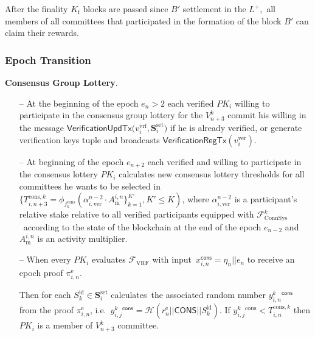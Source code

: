 \begin{legal}
    \item After the finality $K_{\text{f}}$ blocks are passed since $B'$ settlement in the $L^+$,\
    all members of all committees that participated in the formation of the block $B'$ can claim their rewards.

\end{legal}

\subsubsection{Epoch Transition}\label{subsubsec:epoch-transition}
\begin{legal}
    \item \textbf{Consensus Group Lottery}.
    \begin{itemize}
        \item [--] At the beginning of the epoch ${e_n > 2}$ each verified $PK_i$ willing to participate in the
        consensus group lottery for the $V^k_{n + 3}$ commit his willing in the message $\textsf{VerificationUpdTx(}v_i^{\text{vrf}}, \mathbf{S}_i^{\text{set}}\textsf{)}$
        if he is already verified, or generate verification keys tuple and broadcasts $\textsf{VerificationRegTx}(v_i^{\text{ver}})$.
        \item[--] At beginning of the epoch $e_{n + 2}$ each verified and willing to participate in the consensus lottery $PK_i$
        calculates new consensus lottery thresholds for all committees he wants to be selected in \
        $\{T_{i, n + 3}^{\text{cons}, k} = \phi_{f^{\text{cons}}_k}(\alpha^{n-2}_{i, \text{ver}} \cdot A^{i, n}_{\text{m}}\}_{k=1}^{K'}, K' \leq K)$,
        where $\alpha^{n-2}_{i, \text{ver}}$ is a participant's relative stake relative to all verified participants equipped with $\mathcal{F}^k_{\text{ConnSys}}$\
        according to the state of the blockchain at the end of the epoch $e_{n-2}$ and $A^{i, n}_{\text{m}}$ is an activity multiplier.
        \item [--] When every $PK_i$ evaluates ${\mathcal{F}}_{\text{VRF}}$ with input\
        $x_{i, n}^{\textsf{cons}} = \eta_n || e_n $ to receive an epoch proof $\pi_{i, n}^{\text{e}}$.

        \bigskip
        Then for each $S_k^{\text{id}}\in \mathbf{S}_i^{\text{set}}$ calculates\
        the associated random number $y^k_{i, n}^{\textsf{cons}}$ from the proof $\pi_{i, n}^{\text{e}}$, i.e.\
        ${y^k_{i, j}^{\textsf{cons}} = \mathcal{H}(r_{n}^{\text{e}}||\textsf{CONS}||S_k^{\text{id}})}$.
        If $y^k_{i, j}^{\text{cons}} < T_{i, n}^{\text{cons}, k}$ then $PK_i$ is a member of $V^k_{n+3}$ committee.


\end{itemize}
\end{legal}
